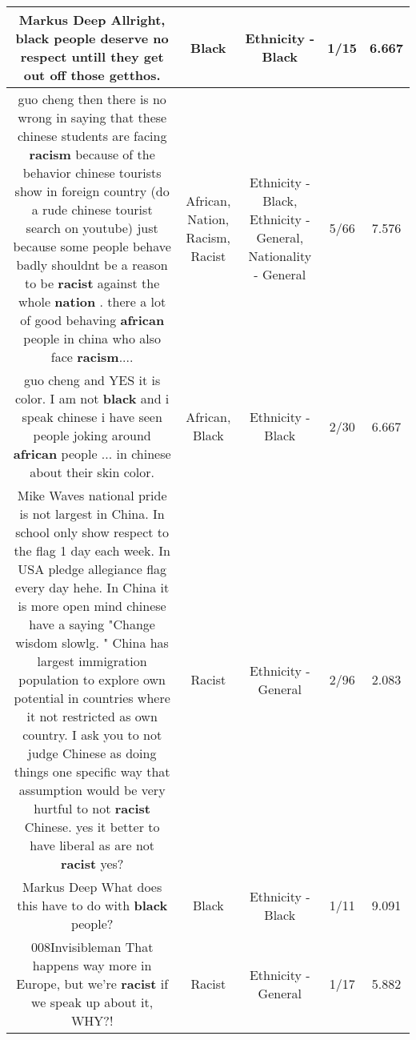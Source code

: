 \documentclass[11pt]{article}
\newlength\mylength
\begin{document}
\begin{center}
\begin{longtable}{|C{.65\mylength}|C{.30\mylength}|C{.12\mylength}|C{.12\mylength}|C{.12\mylength}|}
  \small Markus Deep Allright, \textbf{black} people deserve no respect untill they get out off those getthos.\normalsize   & Black & Ethnicity - Black & 1/15 & 6.667 \\  \hline
  \small guo cheng then there is no wrong in saying that these chinese students are facing \textbf{racism} because of the behavior chinese tourists show in foreign country (do a rude chinese tourist search on youtube) just because some people behave badly shouldnt be a reason to be \textbf{racist} against the whole \textbf{nation} . there a lot of good behaving \textbf{african} people in china who also face \textbf{racism}....\normalsize   & African, Nation, Racism, Racist & Ethnicity - Black, Ethnicity - General, Nationality - General & 5/66 & 7.576 \\  \hline
  \small guo cheng and YES it is color. I am not \textbf{black} and i speak chinese i have seen people joking around \textbf{african} people ... in chinese about their skin color.\normalsize   & African, Black & Ethnicity - Black & 2/30 & 6.667 \\  \hline
  \small Mike Waves national pride is not largest in China. In school only show respect to the flag 1 day each week. In USA pledge allegiance  flag every day hehe. In China it is more open mind chinese have a saying "Change wisdom slowlg. "  China has largest immigration population to explore own potential in countries where it not restricted as own country. I ask you to not judge Chinese as doing things one specific way that assumption would be very hurtful to not \textbf{racist} Chinese. yes it better to have liberal as are not \textbf{racist} yes?\normalsize   & Racist & Ethnicity - General & 2/96 & 2.083 \\  \hline
  \small Markus Deep What does this have to do with \textbf{black} people?\normalsize   & Black & Ethnicity - Black & 1/11 & 9.091 \\  \hline
  \small 008Invisibleman That happens way more in Europe, but we're \textbf{racist} if we speak up about it, WHY?!\normalsize   & Racist & Ethnicity - General & 1/17 & 5.882 \\  \hline

\end{longtable}
\end{center}
\end{document}
